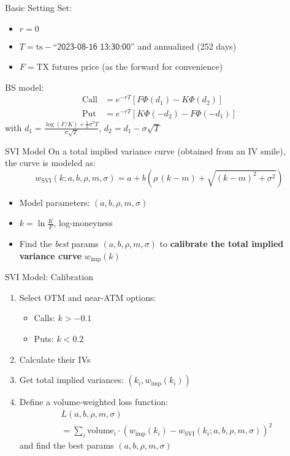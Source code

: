 \documentclass[xe, 12pt]{beamer}
\begin{document}
\begin{frame}{Basic Setting}
Set:
  \begin{itemize}
  \item \(r = 0\)
  \item \(T = \text{ts} - \textsf{``2023-08-16 13:30:00''}\) and annualized (252 days)
  \item \( F = \text{TX futures price} \) (as the forward for convenience)
  \end{itemize}

\vspace{10pt}
BS model:
  \begin{align*}
  \text{Call} &= e^{-rT} \left[ F \Phi(d_1) - K \Phi(d_2) \right] \\
  \text{Put} &= e^{-rT} \left[ K \Phi(-d_2) - F \Phi(-d_1) \right]
  \end{align*}
with $d_1 = \frac{\log(F/K) + \frac{1}{2} \sigma^2 T}{\sigma \sqrt{T}}$,  $d_2= d_1 - \sigma \sqrt{T}$
\end{frame}

\begin{frame}{SVI Model}
On a total implied variance curve (obtained from an IV smile), \\
the curve is modeled as:
  \[
  w_{\text{SVI}}(k; a, b, \rho, m, \sigma) = a + b \left( \rho\,(k - m) + \sqrt{(k - m)^2 + \sigma^2} \right)
  \]
  \begin{itemize}
  \item Model parameters: \((a, b, \rho, m, \sigma)\)
  \item \(k = \ln \frac{K}{F}\), log-moneyness
  \item Find the \textit{best} params $(a, b, \rho, m, \sigma)$ to \textbf{calibrate the total implied variance curve} $w_{\text{imp}}(k)$
  \end{itemize}
\end{frame}

\begin{frame}{SVI Model: Calibration}
\begin{enumerate}
\item Select OTM and near-ATM options: 
    \begin{itemize}
      \item Calls: \(\displaystyle k > -0.1\)  
      \item Puts:  \(\displaystyle k < 0.2\)
    \end{itemize}
\item Calculate their IVs
\item Get total implied variances: \( (k_i, w_{\text{imp}}(k_i)) \)
\item Define a \alert{volume‐weighted} loss function:
  \begin{multline*}
  L(a, b, \rho, m, \sigma) \\
  = \sum_{i} \text{volume}_i \cdot (w_{\text{imp}}(k_i) - w_{\text{SVI}}(k_i; a, b, \rho, m, \sigma))^2
  \end{multline*}
and find the best params $(a, b, \rho, m, \sigma)$
\end{enumerate}
\end{frame}
\end{document}
